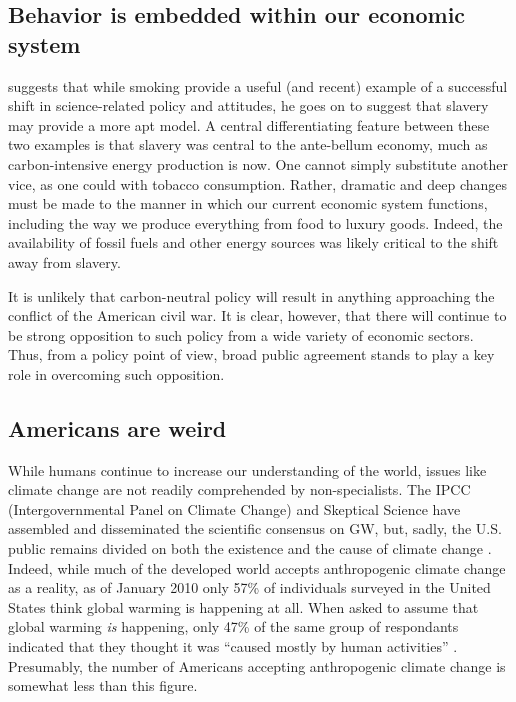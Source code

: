 \subsection{Behavior is embedded within our economic system}

\textcite{hoffman_climate_2010} suggests that while smoking provide a useful
(and recent) example of a successful shift in science-related policy and
attitudes, he goes on to suggest that slavery may provide a more apt model. A
central differentiating feature between these two examples is that slavery was
central to the ante-bellum economy, much as carbon-intensive energy production
is now.  One cannot simply substitute another vice, as one could with tobacco
consumption.  Rather, dramatic and deep changes must be made to the manner in
which our current economic system functions, including the way we produce
everything from food to luxury goods. Indeed, the availability of fossil fuels
and other energy sources was likely critical to the shift away from slavery.

It is unlikely that carbon-neutral policy will result in anything approaching
the conflict of the American civil war. It is clear, however, that there will
continue to be strong opposition to such policy from a wide variety of economic
sectors. Thus, from a policy point of view, broad public agreement stands to
play a key role in overcoming such opposition.

\subsection{Americans are weird}

While humans continue to increase our understanding of the world, issues like
climate change are not readily comprehended by non-specialists. The IPCC
(Intergovernmental Panel on Climate Change) and Skeptical Science have assembled
and disseminated the scientific consensus on GW, but, sadly, the U.S.  public
remains divided on both the existence and the cause of climate change
\parencite[cf.][]{hoffman_growing_2011}. Indeed, while much of the developed
world accepts anthropogenic climate change as a reality, as of January 2010 only
57\% of individuals surveyed in the United States think global warming is
happening at all. When asked to assume that global warming \emph{is} happening,
only 47\% of the same group of respondants indicated that they thought it was
``caused mostly by human activities'' \parencite[Q47 and Q50
in][]{leiserowitz_climate_2010}.  Presumably, the number of Americans accepting
anthropogenic climate change is somewhat less than this figure. 

